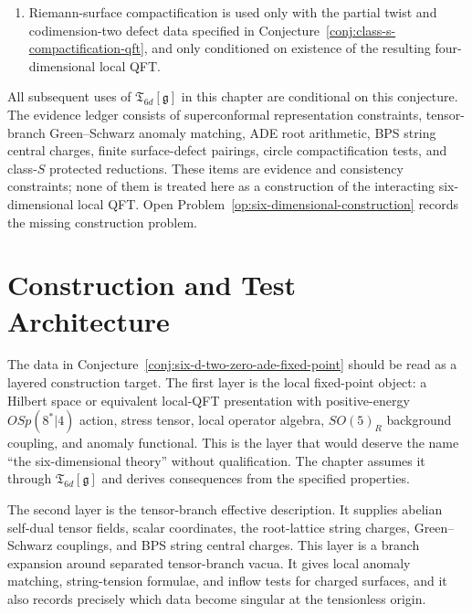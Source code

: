 \begin{conjecture}
\begin{enumerate}[label=\textup{(\roman*)}]
choice of finite global-form data where the compactified low-energy
description is valid, is conjecturally described by five-dimensional
maximally supersymmetric Yang--Mills with gauge algebra \(\mathfrak g\) and
trace-delta coupling
\[
  g_5^2=4\pi^2R.
\]
This compactification bridge is stated separately in
Conjecture~\ref{conj:six-d-two-zero-circle-to-5d-msym}.
\item Riemann-surface compactification is used only with the partial twist
and codimension-two defect data specified in
Conjecture~\ref{conj:class-s-compactification-qft}, and only conditioned on
existence of the resulting four-dimensional local QFT.
\end{enumerate}
All subsequent uses of \(\mathfrak T_{6d}[\mathfrak g]\) in this chapter are
conditional on this conjecture.  The evidence ledger consists of
superconformal representation constraints, tensor-branch
Green--Schwarz anomaly matching, ADE root arithmetic, BPS string central
charges, finite surface-defect pairings, circle compactification tests, and
class-\(S\) protected reductions.  These items are evidence and consistency
constraints; none of them is treated here as a construction of the interacting
six-dimensional local QFT.  Open
Problem~\ref{op:six-dimensional-construction} records the missing
construction problem.
\end{conjecture}

\section{Construction and Test Architecture}
\label{sec:six-d-construction-test-architecture}

The data in Conjecture~\ref{conj:six-d-two-zero-ade-fixed-point} should be read as a
layered construction target.  The first layer is the local fixed-point
object: a Hilbert space or equivalent local-QFT presentation with
positive-energy \(OSp(8^\ast|4)\) action, stress tensor, local operator
algebra, \(SO(5)_R\) background coupling, and anomaly functional.  This is
the layer that would deserve the name ``the six-dimensional theory'' without
qualification.  The chapter assumes it through
\(\mathfrak T_{6d}[\mathfrak g]\) and derives consequences from the
specified properties.

The second layer is the tensor-branch effective description.  It supplies
abelian self-dual tensor fields, scalar coordinates, the root-lattice string
charges, Green--Schwarz couplings, and BPS string central charges.  This
layer is a branch expansion around separated tensor-branch vacua.  It gives
local anomaly matching, string-tension formulae, and inflow tests for charged
surfaces, and it also records precisely which data become singular at the
tensionless origin.


